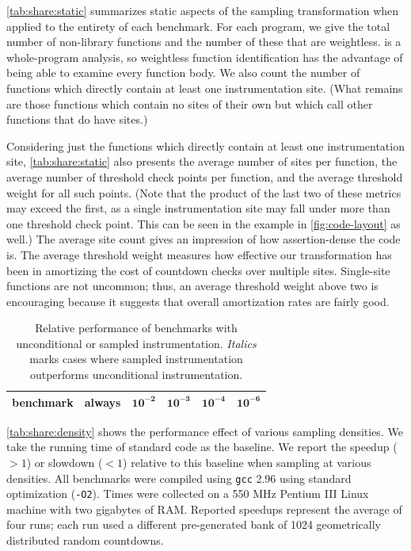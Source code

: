 \autoref{tab:share:static} summarizes static aspects of the sampling
transformation when applied to the entirety of each benchmark.  For
each program, we give the total number of non-library functions and
the number of these that are weightless.  \CCured is a whole-program
analysis, so weightless function identification has the advantage of
being able to examine every function body.  We also count the number
of functions which directly contain at least one instrumentation site.
(What remains are those functions which contain no sites of their own
but which call other functions that do have sites.)

Considering just the functions which directly contain at least one
instrumentation site, \autoref{tab:share:static} also presents the
average number of sites per function, the average number of threshold
check points per function, and the average threshold weight for all
such points.  (Note that the product of the last two of these metrics
may exceed the first, as a single instrumentation site may fall under
more than one threshold check point.  This can be seen in the example
in \autoref{fig:code-layout} as well.)  The average site count gives
an impression of how assertion-dense the code is.  The average
threshold weight measures how effective our transformation has been in
amortizing the cost of countdown checks over multiple sites.
Single-site functions are not uncommon; thus, an average threshold
weight above two is encouraging because it suggests that overall
amortization rates are fairly good.

\begin{table}
  \centering
  \begin{tabular}{|l|r|rrrr|}
    \hline
    \rule{0pt}{2.5ex}
    \textbf{benchmark} & \textbf{always} & $\mathbf{10^{-2}}$ & $\mathbf{10^{-3}}$ & $\mathbf{10^{-4}}$ & $\mathbf{10^{-6}}$ \\
    \hline\hline
    
  \end{tabular}
  \caption{Relative performance of \CCured benchmarks with
    unconditional or sampled instrumentation.  \textit{Italics} marks
    cases where sampled instrumentation outperforms unconditional
    instrumentation.}
  \label{tab:share:density}
\end{table}

\autoref{tab:share:density} shows the performance effect of various
sampling densities.  We take the running time of standard \CCured code
as the baseline.  We report the speedup ($>1$) or slowdown ($<1$)
relative to this baseline when sampling at various densities.  All
benchmarks were compiled using \texttt{gcc} 2.96 using standard
optimization (\texttt{-O2}).  Times were collected on a 550 MHz
Pentium III Linux machine with two gigabytes of RAM\@.  Reported
speedups represent the average of four runs; each run used a different
pre-generated bank of 1024 geometrically distributed random
countdowns.

